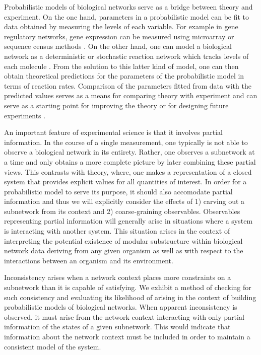 Probabilistic models of biological networks serve as a bridge between theory and experiment.  On the one hand, parameters in a probabilistic model can be fit to data obtained by measuring the levels of each variable. For example in gene regulatory networks, gene expression can be measured using microarray or sequence census methods \cite{Anastassiou2007,Friedman2008a,Zhang2013}.  On the other hand, one can model a biological network as a deterministic or stochastic reaction network which tracks levels of each molecule \cite{Alon2006,Voit2012}.  From the solution to this latter kind of model, one can then obtain theoretical predictions for the parameters of the probabilistic model in terms of reaction rates.  Comparison of the parameters fitted from data with the predicted values serves as a means for comparing theory with experiment and can serve as a starting point for improving the theory or for designing future experiments \cite{Tonsing2014}.

An important feature of experimental science is that it involves partial information.  In the course of a single measurement, one typically is not able to observe a biological network in its entirety.  Rather, one observes a subnetwork at a time and only obtains a more complete picture by later combining these partial views.  This contrasts with theory, where, one makes a representation of a closed system that provides explicit values for all quantities of interest.  In order for a probabilistic model to serve its purpose, it should also accomodate partial information and thus we will explicitly consider the effects of 1) carving out a subnetwork from its context and 2) coarse-graining observables. Observables representing partial information will generally arise in situations where a system is interacting with another system. This situation arises in the context of interpreting the potential existence of modular substructure within biological network data deriving from any given organism as well as with respect to the interactions between an organism and its environment.


Inconsistency arises when a network context places more constraints on a subnetwork than it is capable of satisfying. We exhibit a method of checking for such consistency and evaluating its likelihood of arising in the context of building probabilistic models of biological networks. When apparent inconsistency is observed, it must arise from the network context interacting with only partial information of the states of a given subnetwork. This would indicate that information about the network context must be included in order to maintain a consistent model of the system.

